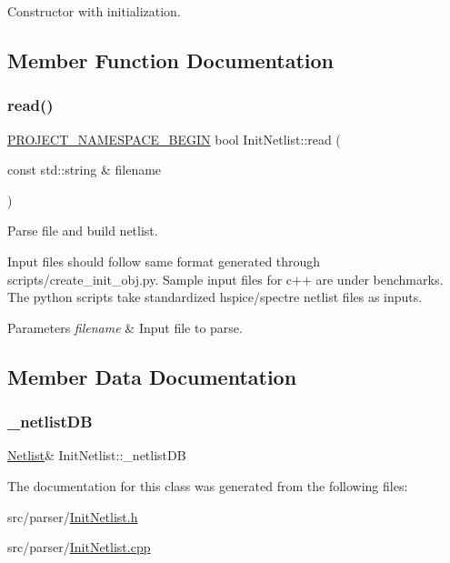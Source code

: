 Constructor with initialization. 



\subsection{Member Function Documentation}
\mbox{\label{classInitNetlist_a4c173b7e51678aad9937969e2e54f867}} 
\subsubsection{\texorpdfstring{read()}{read()}}
{\footnotesize\ttfamily \hyperlink{namespace_8h_ae48726a24dab2034454cf6d79e531eb8}{P\+R\+O\+J\+E\+C\+T\+\_\+\+N\+A\+M\+E\+S\+P\+A\+C\+E\+\_\+\+B\+E\+G\+IN} bool Init\+Netlist\+::read (\begin{DoxyParamCaption}\item[{const std\+::string \&}]{filename }\end{DoxyParamCaption})}



Parse file and build netlist. 

Input files should follow same format generated through scripts/create\+\_\+init\+\_\+obj.\+py. Sample input files for c++ are under benchmarks. The python scripts take standardized hspice/spectre netlist files as inputs.


\begin{DoxyParams}{Parameters}
{\em filename} & Input file to parse. \\
\hline
\end{DoxyParams}


\subsection{Member Data Documentation}
\mbox{\label{classInitNetlist_af6a6b4238c1ecfeebfa3344426647743}} 
\subsubsection{\texorpdfstring{\+\_\+netlist\+DB}{\_netlistDB}}
{\footnotesize\ttfamily \hyperlink{classNetlist}{Netlist}\& Init\+Netlist\+::\+\_\+netlist\+DB\hspace{0.3cm}{\ttfamily [private]}}



The documentation for this class was generated from the following files\+:\begin{DoxyCompactItemize}
\item 
src/parser/\hyperlink{InitNetlist_8h}{Init\+Netlist.\+h}\item 
src/parser/\hyperlink{InitNetlist_8cpp}{Init\+Netlist.\+cpp}\end{DoxyCompactItemize}
